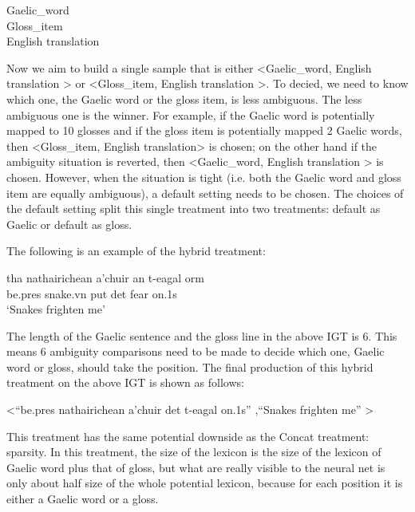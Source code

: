 \documentclass[final]{ua-thesis}
\numberwithin{equation}{section}
\begin{document}
\begin{exe} 
\ex 
	\gll	 Gaelic\_word\\  
     		 Gloss\_item \\
    \glt    English translation  
\end{exe} 

Now we aim to build a single sample that is either <Gaelic\_word, English translation > or <Gloss\_item, English translation >. To decied, we need to know which one, the Gaelic word or the gloss item, is less ambiguous. 
The less ambiguous one is the winner. For example, if the Gaelic word is potentially mapped to 10 glosses and if the gloss item is potentially mapped 2 Gaelic words, then <Gloss\_item, English translation> is chosen; on the other hand if the ambiguity situation is reverted, then <Gaelic\_word, English translation > is chosen. 
However, when the situation is tight (i.e. both the Gaelic word and gloss item are equally ambiguous), a default setting needs to be chosen. The choices of the default setting split this single treatment into two treatments: default as Gaelic or default as gloss.

The following is an example of the hybrid treatment:

\begin{exe}
\ex
	\gll tha nathairichean a'chuir an t-eagal orm\\
		 be.pres snake.vn put det fear on.1s\\
	\glt `Snakes frighten me' 
\end{exe} 

The length of the Gaelic sentence and the gloss line in the above IGT is 6. This means 6 ambiguity comparisons need to be made to decide which one, Gaelic word or gloss, should take the position. The final production of this hybrid treatment on the above IGT is shown as follows:

\begin{exe}
\ex <``be.pres nathairichean a'chuir det t-eagal on.1s'' ,``Snakes frighten me'' >
\end{exe} 

This treatment has the same potential downside as the Concat treatment: sparsity. In this treatment, the size of the lexicon is the size of the lexicon of Gaelic word plus that of gloss, but what are really visible to the neural net is only about half size of the whole potential lexicon, because for each position it is either a Gaelic word or a gloss.
\end{document}
